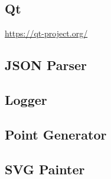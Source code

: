 \subsection{Qt}\label{sec:Qt}
\url{https://qt-project.org/}

\subsection{JSON Parser}

\subsection{Logger}

\subsection{Point Generator}

\subsection{SVG Painter}\label{sec:svg_painter}
